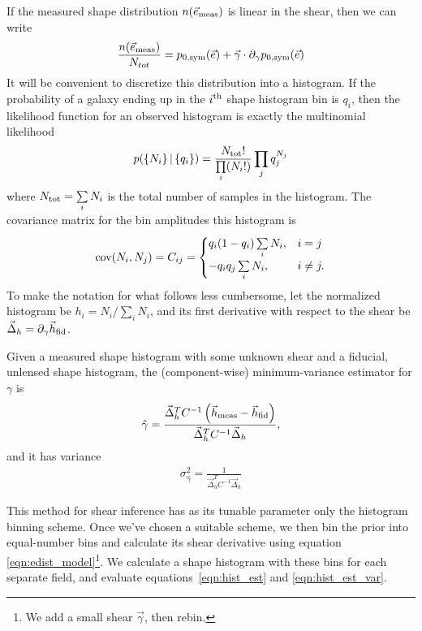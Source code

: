 \documentclass[iop]{emulateapj}
\begin{document}
If the measured shape distribution $n(\vec{e}_{\rm meas})$ is linear
in the shear, then we can write
\begin{align}
\frac{n(\vec{e}_{\rm meas})}{N_{tot}} = p_{0,\rm sym}(\vec{e}) + \vec{\gamma}\cdot \partial_{\gamma} p_{0,\rm sym}(\vec{e})
\end{align}
It will be convenient to discretize this distribution into a
histogram. If the probability of a galaxy ending up in the $i^{\rm
  th}$ shape histogram bin is $q_i$, then the likelihood function for
an observed histogram is exactly the multinomial likelihood
\begin{align}
p( \left\{N_i\right\} |\left\{ q_i\right\} ) = \frac{N_{\rm tot}!}{\prod\limits_i (N_i!)}\prod\limits_j q_j^{N_j}
\label{eqn:multnomial}
\end{align}
where $N_{\rm tot} = \sum\limits_i N_i$ is the total number of samples
in the histogram.  The covariance matrix for the bin amplitudes this
histogram is
\begin{align}
{\rm cov}(N_i, N_j) = C_{ij} = \begin{cases}
  q_i(1-q_i)\sum\limits_i N_i, & i=j \\
  -q_iq_j \sum\limits_i N_i, & i \neq j.
\end{cases}
\end{align}
To make the notation for what follows less cumbersome, let the
normalized histogram be $h_i = N_i / \sum\limits_i N_i$, and its first
derivative with respect to the shear be
$\vec{\Delta}_h=\partial_{\gamma}\vec{h}_{\rm fid}$.

Given a measured shape histogram with some unknown shear and a
fiducial, unlensed shape histogram, the (component-wise)
minimum-variance estimator for $\gamma$ is
\begin{align}
\hat{\gamma} = \frac{\vec{\Delta}_h^T C^{-1}\left( \vec{h}_{\rm meas} - \vec{h}_{\rm fid}\right)} {\vec{\Delta}_h^TC^{-1}\vec{\Delta}_h},
\label{eqn:hist_est}
\end{align}
and it has variance
\begin{align}
\sigma^2_{\hat{\gamma}} = \frac{1}{\vec{\Delta}_h^TC^{-1}\vec{\Delta}_h}
\label{eqn:hist_est_var}
\end{align}

This method for shear inference has as its tunable parameter only the
histogram binning scheme. Once we've chosen a suitable scheme, we then
bin the prior into equal-number bins and calculate its shear
derivative using equation \ref{eqn:edist_model}\footnote{We add a
  small shear $\vec{\gamma}$, then rebin.}. We calculate a shape
histogram with these bins for each separate field, and evaluate
equations~\ref{eqn:hist_est} and \ref{eqn:hist_est_var}.
\end{document}
